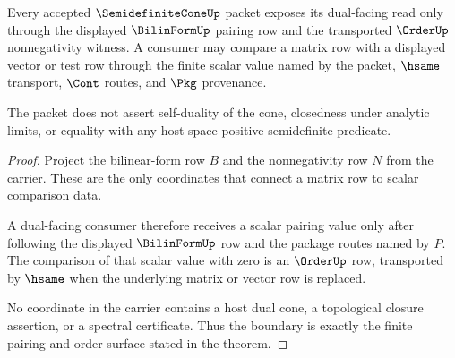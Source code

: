\begin{theorem}
\label{thm:semidefinitecone-dual-pairing-boundary}
Every accepted $\SemidefiniteConeUp$ packet exposes its dual-facing read only through the displayed $\BilinFormUp$ pairing row and the transported $\OrderUp$ nonnegativity witness. A consumer may compare a matrix row with a displayed vector or test row through the finite scalar value named by the packet, $\hsame$ transport, $\Cont$ routes, and $\Pkg$ provenance.

The packet does not assert self-duality of the cone, closedness under analytic limits, or equality with any host-space positive-semidefinite predicate.
\end{theorem}
\begin{proof}
Project the bilinear-form row $B$ and the nonnegativity row $N$ from the carrier. These are the only coordinates that connect a matrix row to scalar comparison data.

A dual-facing consumer therefore receives a scalar pairing value only after following the displayed $\BilinFormUp$ row and the package routes named by $P$. The comparison of that scalar value with zero is an $\OrderUp$ row, transported by $\hsame$ when the underlying matrix or vector row is replaced.

No coordinate in the carrier contains a host dual cone, a topological closure assertion, or a spectral certificate. Thus the boundary is exactly the finite pairing-and-order surface stated in the theorem.
\end{proof}

